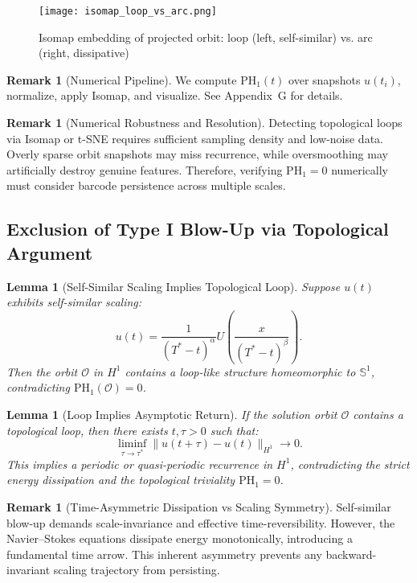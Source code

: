 \documentclass[11pt]{article}
\newtheorem{lemma}[theorem]{Lemma}
\theoremstyle{definition}
\newtheorem{remark}[theorem]{Remark}
\begin{document}
\begin{figure}[h]
  \centering
  \texttt{[image: isomap\_loop\_vs\_arc.png]}
  \caption{Isomap embedding of projected orbit: loop (left, self-similar) vs. arc (right, dissipative)}
\end{figure}

\begin{remark}[Numerical Pipeline]
We compute $\mathrm{PH}_1(t)$ over snapshots $u(t_i)$, normalize, apply Isomap, and visualize. See Appendix~G for details.
\end{remark}

\begin{remark}[Numerical Robustness and Resolution]
Detecting topological loops via Isomap or t-SNE requires sufficient sampling density and low-noise data. Overly sparse orbit snapshots may miss recurrence, while oversmoothing may artificially destroy genuine features. Therefore, verifying $\mathrm{PH}_1 = 0$ numerically must consider barcode persistence across multiple scales.
\end{remark}

\subsection{Exclusion of Type I Blow-Up via Topological Argument}

\begin{lemma}[Self-Similar Scaling Implies Topological Loop]
Suppose $u(t)$ exhibits self-similar scaling:
\[
 u(t) = \frac{1}{(T^* - t)^\alpha} U\left( \frac{x}{(T^* - t)^\beta} \right).
\]
Then the orbit $\mathcal{O}$ in $H^1$ contains a loop-like structure homeomorphic to $\mathbb{S}^1$, contradicting $\mathrm{PH}_1(\mathcal{O}) = 0$.
\end{lemma}

\begin{lemma}[Loop Implies Asymptotic Return]
If the solution orbit $\mathcal{O}$ contains a topological loop, then there exists $t, \tau > 0$ such that:
\[
\liminf_{\tau \to \tau^*} \|u(t + \tau) - u(t)\|_{H^1} \to 0.
\]
This implies a periodic or quasi-periodic recurrence in $H^1$, contradicting the strict energy dissipation and the topological triviality $\mathrm{PH}_1 = 0$.
\end{lemma}

\begin{remark}[Time-Asymmetric Dissipation vs Scaling Symmetry]
Self-similar blow-up demands scale-invariance and effective time-reversibility. However, the Navier--Stokes equations dissipate energy monotonically, introducing a fundamental time arrow. This inherent asymmetry prevents any backward-invariant scaling trajectory from persisting.
\end{remark}
\end{document}

